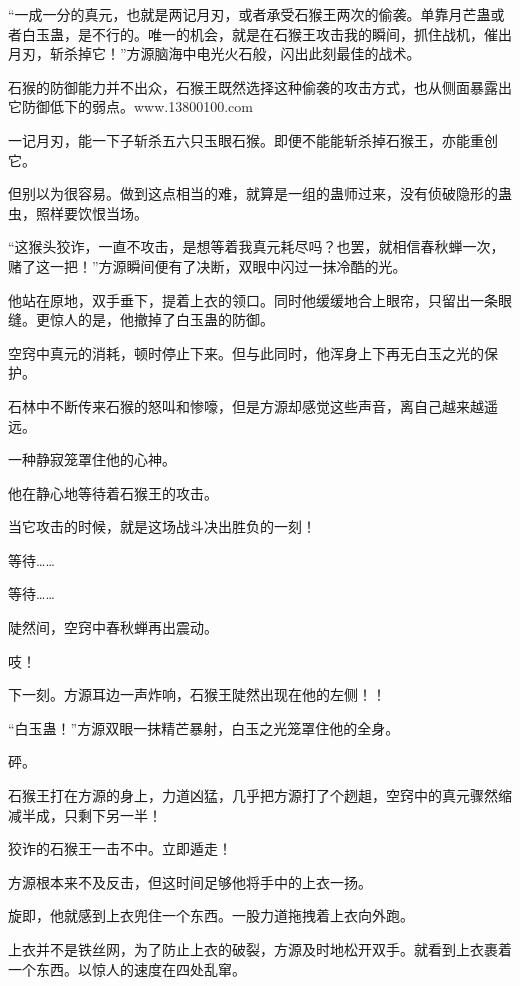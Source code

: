 
\begin{this_body}

“一成一分的真元，也就是两记月刃，或者承受石猴王两次的偷袭。单靠月芒蛊或者白玉蛊，是不行的。唯一的机会，就是在石猴王攻击我的瞬间，抓住战机，催出月刃，斩杀掉它！”方源脑海中电光火石般，闪出此刻最佳的战术。

石猴的防御能力并不出众，石猴王既然选择这种偷袭的攻击方式，也从侧面暴露出它防御低下的弱点。www.13800100.com

一记月刃，能一下子斩杀五六只玉眼石猴。即便不能能斩杀掉石猴王，亦能重创它。

但别以为很容易。做到这点相当的难，就算是一组的蛊师过来，没有侦破隐形的蛊虫，照样要饮恨当场。

“这猴头狡诈，一直不攻击，是想等着我真元耗尽吗？也罢，就相信春秋蝉一次，赌了这一把！”方源瞬间便有了决断，双眼中闪过一抹冷酷的光。

他站在原地，双手垂下，提着上衣的领口。同时他缓缓地合上眼帘，只留出一条眼缝。更惊人的是，他撤掉了白玉蛊的防御。

空窍中真元的消耗，顿时停止下来。但与此同时，他浑身上下再无白玉之光的保护。

石林中不断传来石猴的怒叫和惨嚎，但是方源却感觉这些声音，离自己越来越遥远。

一种静寂笼罩住他的心神。

他在静心地等待着石猴王的攻击。

当它攻击的时候，就是这场战斗决出胜负的一刻！

等待……

等待……

陡然间，空窍中春秋蝉再出震动。

吱！

下一刻。方源耳边一声炸响，石猴王陡然出现在他的左侧！！

“白玉蛊！”方源双眼一抹精芒暴射，白玉之光笼罩住他的全身。

砰。

石猴王打在方源的身上，力道凶猛，几乎把方源打了个趔趄，空窍中的真元骤然缩减半成，只剩下另一半！

狡诈的石猴王一击不中。立即遁走！

方源根本来不及反击，但这时间足够他将手中的上衣一扬。

旋即，他就感到上衣兜住一个东西。一股力道拖拽着上衣向外跑。

上衣并不是铁丝网，为了防止上衣的破裂，方源及时地松开双手。就看到上衣裹着一个东西。以惊人的速度在四处乱窜。


\end{this_body}
